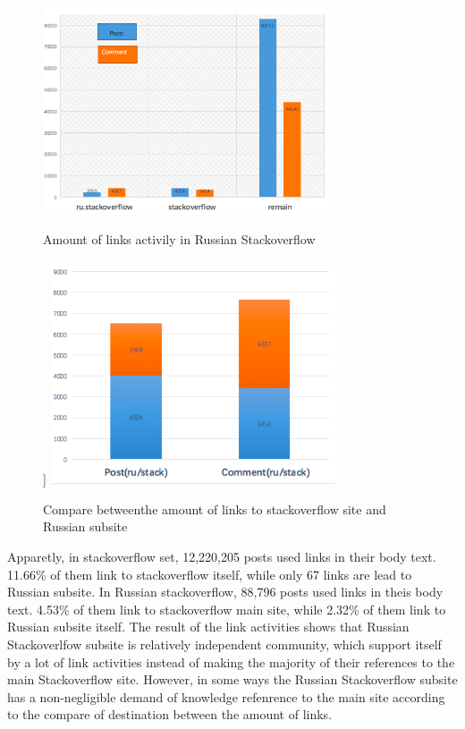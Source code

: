 \documentclass{article}
\begin{document}
	\begin{figure}[H]
		\includegraphics[width = 0.75\textwidth]{link1.png}
		\caption{Amount of links activily in Russian Stackoverflow}]
		\includegraphics[width = 0.75\textwidth]{link2.png}
		\caption{Compare betweenthe amount of links to stackoverflow site and Russian subsite}
  	\end{figure}
Apparetly, in stackoverflow set, 12,220,205 posts used links in their body text. 11.66\% of them link to stackoverflow itself, while only 67 links are lead to Russian subsite. In Russian stackoverflow, 88,796 posts used links in theis body text. 4.53\% of them link to stackoverflow main site, while 2.32\% of them link to Russian subsite itself. The result of the link activities shows that Russian Stackoverlfow subsite is relatively independent community, which support itself by a lot of link activities instead of making the majority of their references to the main Stackoverflow site. However, in some ways the Russian Stackoverflow subsite has a non-negligible demand of knowledge refenrence to the main site according to the compare of destination between the amount of links.
		
\end{document}
